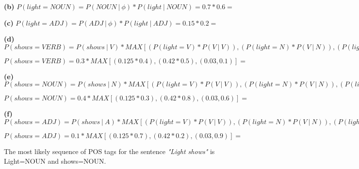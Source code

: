 \documentclass[11pt]{article}
\renewcommand\part[1]{\vspace{.10in}\textbf{(#1)}}
\begin{document}
\part{b} $P(light=NOUN) = P(NOUN \ | \ \phi) * P(light \ | \ NOUN) = 0.7 * 0.6 =$ 

\part{c} $P(light=ADJ) = P(ADJ \ | \ \phi) * P(light \ | \ ADJ) = 0.15 * 0.2 =$ 

\part{d} $P(shows=VERB) = P(shows \ | \ V) * MAX[(P(light=V) * P(V \ | \ V)), (P(light=N) * P(V \ | \ N)), (P(light=A) * P(V \ | \ A))]$

$P(shows=VERB) = 0.3 * MAX[(0.125 * 0.4), (0.42 * 0.5), (0.03, 0.1)] = $  

\part{e} $P(shows=NOUN) = P(shows \ | \ N) * MAX[(P(light=V) * P(V \ | \ V)), (P(light=N) * P(V \ | \ N)), (P(light=A) * P(VE \ | \ A))]$

$P(shows=NOUN) = 0.4 * MAX[(0.125 * 0.3), (0.42 * 0.8), (0.03, 0.6)] =$ 

\part{f} $P(shows=ADJ) = P(shows \ | \ A) * MAX[(P(light=V) * P(V \ | \ V)), (P(light=N) * P(V \ | \ N)), (P(light=A) * P(V \ | \ A))]$

$P(shows=ADJ) = 0.1 * MAX[(0.125 * 0.7), (0.42 * 0.2), (0.03, 0.9)] =$ 

The most likely sequence of POS tags for the sentence \textit{"Light shows"} is Light=NOUN and shows=NOUN.

\end{document}
